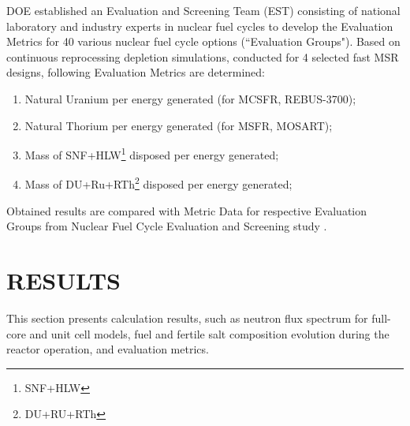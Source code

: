 \documentclass{anstrans}
\begin{document}
DOE established an Evaluation and Screening Team (EST) consisting of national laboratory and industry experts in nuclear fuel cycles to develop the Evaluation Metrics for 40 various nuclear fuel cycle options (``Evaluation Groups"). Based on continuous reprocessing depletion simulations, conducted for 4 selected fast \gls{MSR} designs, following Evaluation Metrics are determined:
\vspace{-0.06in}
\begin{enumerate}
	\item Natural Uranium per energy generated (for \gls{MCSFR}, REBUS-3700);\vspace{-0.07in}
	\item Natural Thorium per energy generated (for \gls{MSFR}, \gls{MOSART});\vspace{-0.07in}
	\item Mass of SNF+HLW\footnote{\gls{SNF}+\gls{HLW}} disposed per energy generated;\vspace{-0.06in}
	\item Mass of DU+Ru+RTh\footnote{\gls{DU}+\gls{RU}+\gls{RTh}} disposed per energy  generated;\vspace{-0.05in}
\end{enumerate}
Obtained results are compared with Metric Data for respective Evaluation Groups from Nuclear Fuel Cycle Evaluation and Screening study \cite{wigeland_nuclear_2014}.

\section{RESULTS} 
This section presents calculation results, such as neutron flux spectrum for full-core and unit cell models, fuel and fertile salt composition evolution during the reactor operation, and evaluation metrics.
\end{document}
